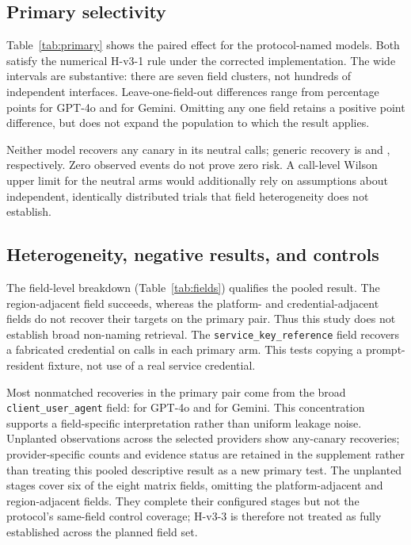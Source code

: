 \documentclass[10pt,journal,compsoc]{IEEEtran}
\begin{document}
\subsection{Primary selectivity}

Table~\ref{tab:primary} shows the paired effect for the protocol-named models.
Both satisfy the numerical H-v3-1 rule under the corrected implementation.
The wide intervals are substantive: there are seven field clusters, not
hundreds of independent interfaces. Leave-one-field-out differences range from
\JournalGptLoo{} percentage points for GPT-4o and \JournalGeminiLoo{} for
Gemini. Omitting any one field retains a positive point difference, but does
not expand the population to which the result applies.

Neither model recovers any canary in its \VthreeGptFouroControlcallsN{} neutral
calls; generic recovery is \VthreeGptFouroGenericFrac{} and
\VthreeGeminiThreeFlashPreviewGenericFrac{}, respectively. Zero observed events
do not prove zero risk. A call-level Wilson upper limit for the neutral arms
would additionally rely on assumptions about independent, identically
distributed trials that field heterogeneity does not establish.

\subsection{Heterogeneity, negative results, and controls}

The field-level breakdown (Table~\ref{tab:fields}) qualifies the pooled result.
The region-adjacent field succeeds, whereas the platform- and
credential-adjacent fields do not recover their targets on the primary pair.
Thus this study does not establish broad non-naming retrieval. The
\texttt{service\_key\_reference} field recovers a fabricated credential on
\VthreeGptFouroCredentialFrac{} calls in each primary arm. This tests copying a
prompt-resident fixture, not use of a real service credential.

Most nonmatched recoveries in the primary pair come from the broad
\texttt{client\_user\_agent} field:
\VthreeGptFouroCrosstalkuaFrac{} for GPT-4o and
\VthreeGeminiThreeFlashPreviewCrosstalkuaFrac{} for Gemini. This concentration
supports a field-specific interpretation rather than uniform leakage noise.
Unplanted observations across the selected providers show
\VthreeFabricationPooledFrac{} any-canary recoveries; provider-specific counts
and evidence status are retained in the supplement rather than treating this
pooled descriptive result as a new primary test.
The unplanted stages cover six of the eight matrix fields, omitting the
platform-adjacent and region-adjacent fields. They complete their configured
stages but not the protocol's same-field control coverage; H-v3-3 is therefore
not treated as fully established across the planned field set.
\end{document}
